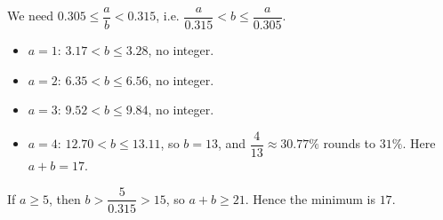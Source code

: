 We need $0.305\le\dfrac ab<0.315$, i.e. $\dfrac{a}{0.315}<b\le\dfrac{a}{0.305}$.
\begin{itemize}
\item $a=1$: $3.17<b\le3.28$, no integer.
\item $a=2$: $6.35<b\le6.56$, no integer.
\item $a=3$: $9.52<b\le9.84$, no integer.
\item $a=4$: $12.70<b\le13.11$, so $b=13$, and $\dfrac4{13}\approx30.77\%$ rounds to $31\%$. Here $a+b=17$.
\end{itemize}
If $a\ge5$, then $b>\dfrac{5}{0.315}>15$, so $a+b\ge21$. Hence the minimum is $\boxed{17}$.
